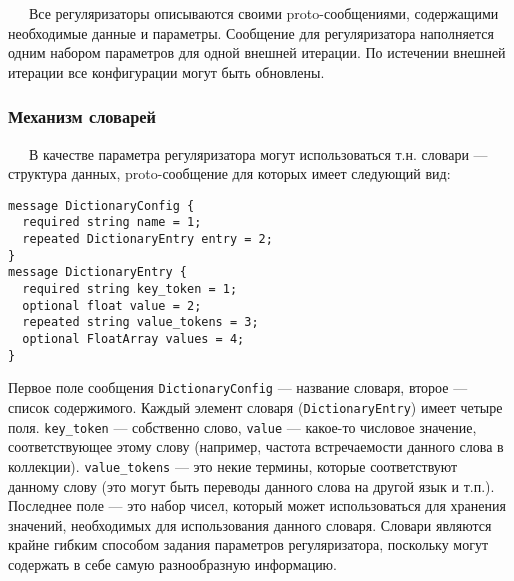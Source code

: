 $\quad\;\:$Все регуляризаторы описываются своими proto-сообщениями, содержащими необходимые данные и параметры. Сообщение для регуляризатора наполняется одним набором параметров для одной внешней итерации. По истечении внешней итерации все конфигурации могут быть обновлены.

\subsubsection{Механизм словарей} 
$\quad\;\:$В качестве параметра регуляризатора могут использоваться т.н. словари --- структура данных, proto-сообщение для которых имеет следующий вид:

\vspace{4pt}
\noindent
\verb|message DictionaryConfig {| \\
\verb|  required string name = 1;| \\
\verb|  repeated DictionaryEntry entry = 2;| \\
\verb|}| \\
\noindent
\verb|message DictionaryEntry {| \\
\verb|  required string key_token = 1;| \\
\verb|  optional float value = 2;| \\
\verb|  repeated string value_tokens = 3;| \\
\verb|  optional FloatArray values = 4;| \\
\verb|}|

\vspace{4pt}

Первое поле сообщения \verb|DictionaryConfig| --- название словаря, второе --- список содержимого. Каждый элемент словаря (\verb|DictionaryEntry|) имеет четыре поля. \verb|key_token| --- собственно слово, \verb|value| --- какое-то числовое значение, соответствующее этому слову (например, частота встречаемости данного слова в коллекции). \verb|value_tokens| --- это некие термины, которые соответствуют данному слову (это могут быть переводы данного слова на другой язык и т.п.). Последнее поле --- это набор чисел, который может использоваться для хранения значений, необходимых для использования данного словаря. Словари являются крайне гибким способом задания параметров регуляризатора, поскольку могут содержать в себе самую разнообразную информацию. 

